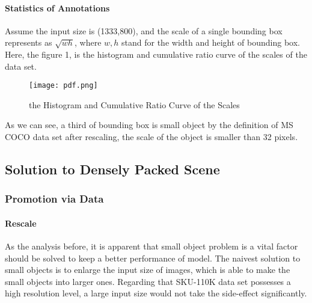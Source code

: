 \documentclass{article}
\begin{document}
\paragraph{Statistics of Annotations} Assume the input size is (1333,800), and the scale of a single bounding box represents as $\sqrt{wh}$, where $w,h$ stand for the width and height of bounding box. Here, the figure 1, is the histogram and cumulative ratio curve of the scales of the data set.
\begin{figure}[htb]
    \centering
    \texttt{[image: pdf.png]}
    \caption{the Histogram and Cumulative Ratio Curve of the Scales}
    \label{fig:my_label}
\end{figure}

\par As we can see, a third of bounding box is small object by the definition of MS COCO data set\cite{coco} after rescaling, the scale of the object is smaller than 32 pixels.
\subsection{Solution to Densely Packed Scene}
\subsubsection{Promotion via Data}
\paragraph{Rescale}As the analysis before, it is apparent that small object problem is a vital factor should be solved to keep a better performance of model. The naivest solution to small objects is to enlarge the input size of images, which is able to make the small objects into larger ones. Regarding that SKU-110K data set possesses a high resolution level, a large input size would not take the side-effect significantly.
\end{document}
